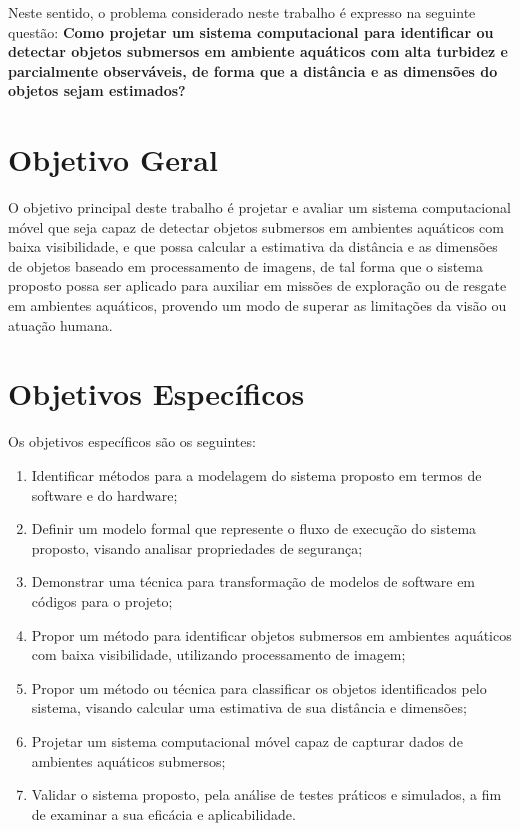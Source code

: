 Neste sentido, o problema considerado neste trabalho é expresso na seguinte questão: \textbf{Como projetar um sistema computacional para identificar ou detectar objetos submersos em ambiente aquáticos com alta turbidez e parcialmente observáveis, de forma que a distância e as dimensões do objetos sejam estimados?} 

% 



\section{Objetivo Geral}

O objetivo principal deste trabalho é projetar e avaliar um sistema computacional móvel que seja capaz de detectar objetos submersos em ambientes aquáticos com baixa visibilidade, e que possa calcular a estimativa da distância e as dimensões de objetos baseado em processamento de imagens, 
de tal forma que o sistema proposto possa ser aplicado para auxiliar em missões de exploração ou de resgate em ambientes aquáticos, provendo um modo de superar as limitações da visão ou atuação humana.

\section{Objetivos Específicos}
Os objetivos específicos são os seguintes:
\begin{enumerate}
	\item Identificar métodos para a modelagem do sistema proposto em termos de software e do hardware;

	\item Definir um modelo formal que represente o fluxo de execução do sistema proposto, visando analisar propriedades de segurança;

	\item Demonstrar uma técnica para transformação de modelos de software em códigos para o projeto;

	\item Propor um método para identificar objetos submersos em ambientes aquáticos com baixa visibilidade, utilizando processamento de imagem;

	\item Propor um método ou técnica para classificar os objetos identificados pelo sistema, visando calcular uma estimativa de sua distância e dimensões;

	\item Projetar um sistema computacional móvel capaz de capturar dados de ambientes aquáticos submersos;

	\item Validar o sistema proposto, pela análise de testes práticos e simulados, a fim de examinar a sua eficácia e aplicabilidade.

\end{enumerate}
    

